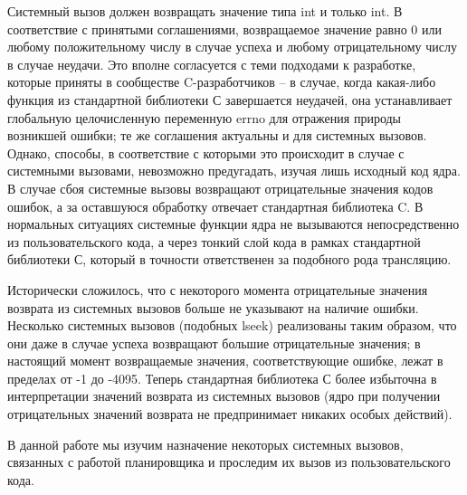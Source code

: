 Системный вызов должен возвращать значение типа int и только int. В соответствие с принятыми соглашениями, возвращаемое значение равно 0 или любому положительному числу в случае успеха и любому отрицательному числу в случае неудачи. Это вполне согласуется с теми подходами к разработке, которые приняты в сообществе C-разработчиков -- в случае, когда какая-либо функция из стандартной библиотеки С завершается неудачей, она устанавливает глобальную целочисленную переменную errno для отражения природы возникшей ошибки; те же соглашения актуальны и для системных вызовов. Однако, способы, в соответствие с которыми это происходит в случае с системными вызовами, невозможно предугадать, изучая лишь исходный код ядра. В случае сбоя системные вызовы возвращают отрицательные значения кодов ошибок, а за оставшуюся обработку отвечает стандартная библиотека C. В нормальных ситуациях системные функции ядра не вызываются непосредственно из пользовательского кода, а через тонкий слой кода в рамках стандартной библиотеки С, который в точности ответственен за подобного рода трансляцию\cite{Maxwell}.

Исторически сложилось, что с некоторого момента отрицательные значения возврата из системных вызовов больше не указывают на наличие ошибки. Несколько системных вызовов (подобных lseek) реализованы таким образом, что они даже в случае успеха возвращают большие отрицательные значения; в настоящий момент возвращаемые значения, соответствующие ошибке, лежат в пределах от -1 до -4095. Теперь стандартная библиотека С более избыточна в интерпретации значений возврата из системных вызовов (ядро при получении отрицательных значений возврата не предпринимает никаких особых действий).

В данной работе мы изучим назначение некоторых системных вызовов, связанных с работой планировщика и проследим их вызов из пользовательского кода.